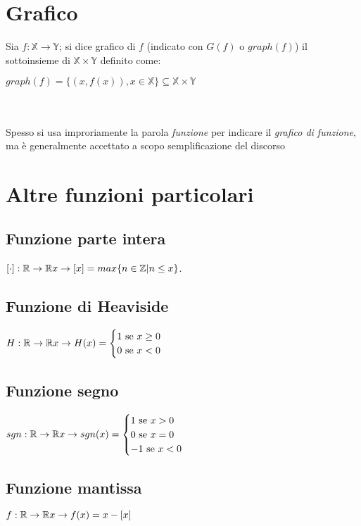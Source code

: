\section{Grafico}
Sia $f: \mathbb{X} \rightarrow \mathbb{Y}$; si dice grafico di $f$ (indicato con $G(f)$ o $graph(f)$) il sottoinsieme di $\mathbb{X}\times\mathbb{Y}$ definito come:\\
\begin{Large}
$graph(f)=\{(x,f(x)), x \in \mathbb{X}\} \subseteq \mathbb{X}\times\mathbb{Y}$
\end{Large}\\
\\
Spesso si usa improriamente la parola \textit{funzione} per indicare il \textit{grafico di funzione}, ma è generalmente accettato a scopo semplificazione del discorso

\section{Altre funzioni particolari}
\subsection{Funzione parte intera}
$[\cdot]: \mathbb{R} \rightarrow \mathbb{R}\\
x \rightarrow [x] = max\{n \in \mathbb{Z} | n\leq x\}$.
\subsection{Funzione di Heaviside}
$H: \mathbb{R} \rightarrow \mathbb{R}\\
x \rightarrow H(x) =
\begin{cases}
1 \text{  se } x \geq 0\\
0 \text{  se } x < 0
\end{cases}$
\subsection{Funzione segno}
$sgn: \mathbb{R} \rightarrow \mathbb{R}\\
x \rightarrow sgn(x) =
\begin{cases}
1 \text{  se } x > 0\\
0 \text{  se } x = 0\\
-1 \text{  se } x < 0
\end{cases}$
\subsection{Funzione mantissa}
$f: \mathbb{R} \rightarrow \mathbb{R}\\
x \rightarrow f(x) = x - [x]$

